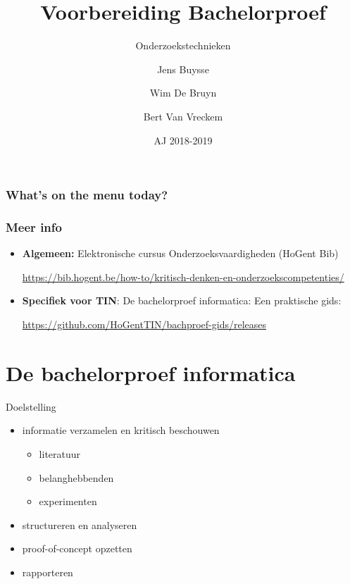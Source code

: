 \documentclass[aspectratio=169,usenames,dvipsnames]{beamer}
\title[OZT: Voorbereiding Bachelorproef]{Voorbereiding Bachelorproef}
\subtitle{Onderzoekstechnieken}
\author{Jens Buysse \and Wim {De Bruyn} \and Bert {Van Vreckem}}
\date{AJ 2018-2019}
\begin{document}

\begin{frame}
\maketitle
\end{frame}

\begin{frame}
\frametitle{What's on the menu today?}

\tableofcontents
\end{frame}

\begin{frame}
  \frametitle{Meer info}
  
  \begin{itemize}
    \item \textbf{Algemeen:} Elektronische cursus Onderzoeksvaardigheden (HoGent Bib)
    
    \url{https://bib.hogent.be/how-to/kritisch-denken-en-onderzoekscompetenties/}
    
    \item \textbf{Specifiek voor TIN}: De bachelorproef informatica: Een praktische gids:
    
    \url{https://github.com/HoGentTIN/bachproef-gids/releases}
  \end{itemize}
\end{frame}

\section{De bachelorproef informatica}

\begin{frame}{Doelstelling}
  
  
  \begin{itemize}
    \item informatie verzamelen en kritisch beschouwen
    \begin{itemize}
      \item literatuur
      \item belanghebbenden
      \item experimenten
    \end{itemize}
    \item structureren en analyseren
    \item proof-of-concept opzetten
    \item rapporteren
  \end{itemize}

\end{frame}
\end{document}
